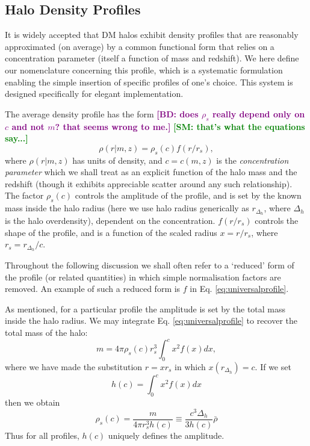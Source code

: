 \documentclass[5p]{elsarticle}
\newcommand{\bd}[1]{\textcolor{purple}{\textbf{[BD: #1]}}}
\newcommand{\sgm}[1]{\textcolor{green}{\textbf{[SM: #1]}}}
\begin{document}
\subsection{Halo Density Profiles}
\label{sec:profilestheory}
It is widely accepted that DM halos exhibit density profiles that are reasonably approximated (on average) by a common functional form that relies on a concentration parameter (itself a function of mass and redshift). 
We here define our nomenclature concerning this profile, which is a systematic formulation enabling the simple insertion of specific profiles of one's choice. This system is designed specifically for elegant implementation.

The average density profile has the form \bd{does $\rho_s$ really depend only on $c$ and not $m$? that seems wrong to me.} \sgm{that's what the equations say...}
\begin{equation}
    \label{eq:universalprofile}
    \rho(r|m,z) = \rho_s(c) f(r/r_s),
\end{equation}
where $\rho(r|m,z)$ has units of density, and $c = c(m,z)$ is the \textit{concentration parameter} which we shall treat as an explicit function of the halo mass and the redshift (though it exhibits appreciable scatter around any such relationship). 
The factor $\rho_s(c)$ controls the amplitude of the profile, and is set by the known mass inside the halo radius (here we use halo radius generically as $r_{\Delta_h}$, where $\Delta_h$ is the halo overdensity), dependent on the concentration. 
$f(r/r_s)$ controls the shape of the profile, and is a function of the scaled radius $x=r/r_s$, where $r_s = r_{\Delta_h}/c$.

Throughout the following discussion we shall often refer to a `reduced' form of the profile (or related quantities) in which simple normalisation factors are removed. An example of such a reduced form is $f$ in Eq. \ref{eq:universalprofile}. 

As mentioned, for a particular profile the amplitude is set by the total mass inside the halo radius. We may integrate Eq. \ref{eq:universalprofile} to recover the total mass of the halo:
\begin{equation}
\label{eq:minrv}
m = 4\pi \rho_s(c) r_s^3 \int_0^c x^2 f(x) dx,
\end{equation}
where we have made the substitution $r = xr_s$ in which $x(r_{\Delta_h}) = c$.
If we set
\begin{equation}
\label{eq:hofc}
h(c) = \int_0^c x^2 f(x) dx
\end{equation}
then we obtain
\begin{equation}
\label{eq:hofm}
\rho_s(c) = \frac{m}{4 \pi r_s^3 h(c)} \equiv \frac{c^3 \Delta_h}{3h(c)}\bar{\rho}
\end{equation}
Thus for all profiles, $h(c)$ uniquely defines the amplitude.
\end{document}

